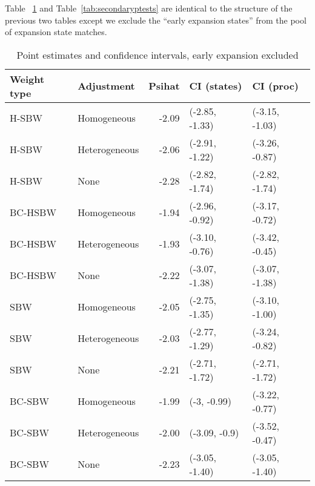 Table ~\ref{tab:confintmainc2} and Table~\ref{tab:secondaryptests} are identical to the structure of the previous two tables except we exclude the ``early expansion states'' from the pool of expansion state matches. 

\begin{table}[ht]
\centering
\caption{Point estimates and confidence intervals, early expansion excluded}
\label{tab:confintmainc2}
\begin{tabular}{llrll}
  \hline
Weight type & Adjustment & Psihat & CI (states) & CI (proc) \\ 
  \hline
H-SBW & Homogeneous & -2.09 & (-2.85, -1.33) & (-3.15, -1.03) \\ 
  H-SBW & Heterogeneous & -2.06 & (-2.91, -1.22) & (-3.26, -0.87) \\ 
  H-SBW & None & -2.28 & (-2.82, -1.74) & (-2.82, -1.74) \\ 
  BC-HSBW & Homogeneous & -1.94 & (-2.96, -0.92) & (-3.17, -0.72) \\ 
  BC-HSBW & Heterogeneous & -1.93 & (-3.10, -0.76) & (-3.42, -0.45) \\ 
  BC-HSBW & None & -2.22 & (-3.07, -1.38) & (-3.07, -1.38) \\ 
  SBW & Homogeneous & -2.05 & (-2.75, -1.35) & (-3.10, -1.00) \\ 
  SBW & Heterogeneous & -2.03 & (-2.77, -1.29) & (-3.24, -0.82) \\ 
  SBW & None & -2.21 & (-2.71, -1.72) & (-2.71, -1.72) \\ 
  BC-SBW & Homogeneous & -1.99 & (-3, -0.99) & (-3.22, -0.77) \\ 
  BC-SBW & Heterogeneous & -2.00 & (-3.09, -0.9) & (-3.52, -0.47) \\ 
  BC-SBW & None & -2.23 & (-3.05, -1.40) & (-3.05, -1.40) \\ 
   \hline
\end{tabular}
\end{table}

